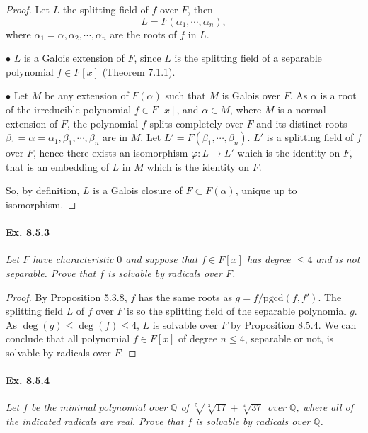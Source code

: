 \documentclass[11pt,a4paper]{article}
\newcommand{\Q}{\mathbb{Q}}
\begin{document}
\begin{proof}
Let $L$ the splitting field of $f$ over $F$, then
$$L = F(\alpha_1,\cdots,\alpha_n),$$
where $\alpha_1=\alpha, \alpha_2,\cdots,\alpha_n$ are the roots of $f$ in $L$.

$\bullet$ $L$ is a Galois extension of $F$, since $L$ is the splitting field of a separable polynomial $f \in F[x]$ (Theorem 7.1.1).

$\bullet$ Let $M$ be any extension of $F(\alpha)$ such that $M$ is Galois over $F$. As $\alpha$ is a root of the irreducible polynomial $f\in F[x]$, and $\alpha \in M$, where $M$ is a normal extension of $F$, the polynomial $f$ splits completely over $F$ and its distinct roots $\beta_1 = \alpha = \alpha_1, \beta_1,\cdots,\beta_n$ are in $M$.
Let $L'= F(\beta_1,\cdots,\beta_n)$. $L'$ is a splitting field of $f$  over $F$, hence there exists an isomorphism  $\varphi : L\to L'$ which is the identity on $F$, that is an embedding of $L$ in $M$ which is the identity on $F$.

So, by definition, $L$ is a Galois closure of $F\subset F(\alpha)$, unique up to isomorphism.
\end{proof}

\paragraph{Ex. 8.5.3}

{\it Let $F$ have characteristic $0$ and suppose that $f\in F[x]$ has degree $\leq 4$ and is not separable. Prove that $f$ is solvable by radicals over $F$.
}

\begin{proof}
By Proposition 5.3.8, $f$ has the same roots as $g = f/\mathrm{pgcd}(f,f')$. The splitting field $L$ of $f$ over $F$ is so the splitting field of the separable polynomial $g$. As $\deg(g) \leq \deg(f) \leq 4$, $L$ is solvable over $F$ by Proposition 8.5.4. We can conclude that all polynomial $f \in F[x]$ of degree $n\leq 4$, separable or not, is solvable by radicals over $F$.
\end{proof}

\paragraph{Ex. 8.5.4}

{\it Let $f$ be the minimal polynomial over $\Q$ of $\sqrt[5]{\sqrt[3]{17} + \sqrt[4]{37}}$ over $\Q$, where all of the indicated radicals are real. Prove that $f$ is solvable by radicals over $\Q$.
}
\end{document}
